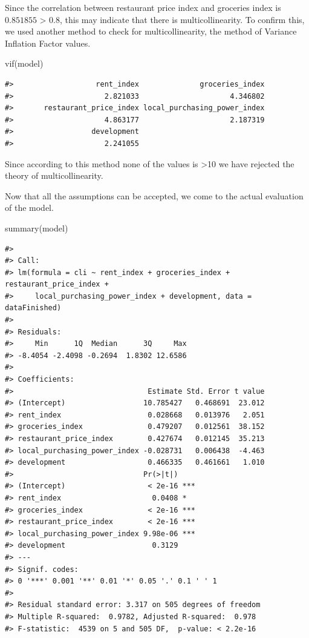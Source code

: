 \documentclass[
  11pt,
  a4paper,
  twoside]{scrbook}
\newenvironment{Shaded}{\begin{snugshade}}{\end{snugshade}}
\newcommand{\FunctionTok}[1]{\textcolor[rgb]{0.00,0.00,0.00}{#1}}
\newcommand{\NormalTok}[1]{#1}
\begin{document}
Since the correlation between restaurant price index and groceries index is
\(0.851855\) \textgreater{} 0.8, this may indicate that there is multicollinearity. To confirm this, we used another method to check for multicollinearity, the method of Variance Inflation Factor values.

\linespread{1}

\begin{Shaded}
\begin{Highlighting}[]
\FunctionTok{vif}\NormalTok{(model)}
\end{Highlighting}
\end{Shaded}

\linespread{1}

\begin{verbatim}
#>                   rent_index              groceries_index 
#>                     2.821033                     4.346802 
#>       restaurant_price_index local_purchasing_power_index 
#>                     4.863177                     2.187319 
#>                  development 
#>                     2.241055
\end{verbatim}

Since according to this method none of the values is \textgreater10 we have rejected the theory of multicollinearity.

Now that all the assumptions can be accepted, we come to the actual evaluation of the model.

\linespread{1}

\begin{Shaded}
\begin{Highlighting}[]
\FunctionTok{summary}\NormalTok{(model)}
\end{Highlighting}
\end{Shaded}

\linespread{1}

\begin{verbatim}
#> 
#> Call:
#> lm(formula = cli ~ rent_index + groceries_index + restaurant_price_index + 
#>     local_purchasing_power_index + development, data = dataFinished)
#> 
#> Residuals:
#>     Min      1Q  Median      3Q     Max 
#> -8.4054 -2.4098 -0.2694  1.8302 12.6586 
#> 
#> Coefficients:
#>                               Estimate Std. Error t value
#> (Intercept)                  10.785427   0.468691  23.012
#> rent_index                    0.028668   0.013976   2.051
#> groceries_index               0.479207   0.012561  38.152
#> restaurant_price_index        0.427674   0.012145  35.213
#> local_purchasing_power_index -0.028731   0.006438  -4.463
#> development                   0.466335   0.461661   1.010
#>                              Pr(>|t|)    
#> (Intercept)                   < 2e-16 ***
#> rent_index                     0.0408 *  
#> groceries_index               < 2e-16 ***
#> restaurant_price_index        < 2e-16 ***
#> local_purchasing_power_index 9.98e-06 ***
#> development                    0.3129    
#> ---
#> Signif. codes:  
#> 0 '***' 0.001 '**' 0.01 '*' 0.05 '.' 0.1 ' ' 1
#> 
#> Residual standard error: 3.317 on 505 degrees of freedom
#> Multiple R-squared:  0.9782, Adjusted R-squared:  0.978 
#> F-statistic:  4539 on 5 and 505 DF,  p-value: < 2.2e-16
\end{verbatim}
\end{document}
